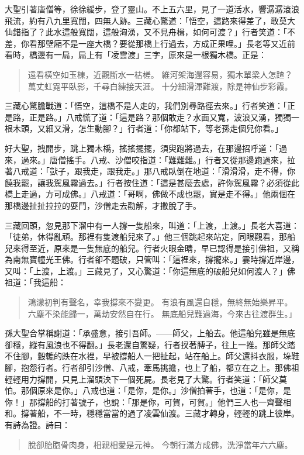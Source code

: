 大聖引著唐僧等，徐徐緩步，登了靈山。不上五六里，見了一道活水，響潺潺滾浪飛流，約有八九里寬闊，四無人跡。三藏心驚道：「悟空，這路來得差了，敢莫大仙錯指了？此水這般寬闊，這般洶湧，又不見舟楫，如何可渡？」行者笑道：「不差，你看那壁廂不是一座大橋？要從那橋上行過去，方成正果哩。」長老等又近前看時，橋邊有一扁，扁上有「凌雲渡」三字，原來是一根獨木橋。正是：
\begin{quote}
遠看橫空如玉棟，近觀斷水一枯槎。
維河架海還容易，獨木單梁人怎蹅？
萬丈虹霓平臥影，千尋白練接天涯。
十分細滑渾難渡，除是神仙步彩霞。
\end{quote}

三藏心驚膽戰道：「悟空，這橋不是人走的，我們別尋路徑去來。」行者笑道：「正是路，正是路。」八戒慌了道：「這是路？那個敢走？水面又寬，波浪又湧，獨獨一根木頭，又細又滑，怎生動腳？」行者道：「你都站下，等老孫走個兒你看。」

好大聖，拽開步，跳上獨木橋，搖搖擺擺，須臾跑將過去，在那邊招呼道：「過來，過來。」唐僧搖手。八戒、沙僧咬指道：「難難難。」行者又從那邊跑過來，拉著八戒道：「獃子，跟我走，跟我走。」那八戒臥倒在地道：「滑滑滑，走不得，你饒我罷，讓我駕風霧過去。」行者按住道：「這是甚麼去處，許你駕風霧？必須從此橋上走過，方可成佛。」八戒道：「哥啊，佛做不成也罷，實是走不得。」他兩個在那橋邊扯扯拉拉的耍鬥，沙僧走去勸解，才撒脫了手。

三藏回頭，忽見那下溜中有一人撐一隻船來，叫道：「上渡，上渡。」長老大喜道：「徒弟，休得亂頑。那裡有隻渡船兒來了。」他三個跳起來站定，同眼觀看，那船兒來得至近，原來是一隻無底的船兒。行者火眼金睛，早已認得是接引佛祖，又稱為南無寶幢光王佛。行者卻不題破，只管叫：「這裡來，撐攏來。」霎時撐近岸邊，又叫：「上渡，上渡。」三藏見了，又心驚道：「你這無底的破船兒如何渡人？」佛祖道：「我這船：
\begin{quote}
鴻濛初判有聲名，幸我撐來不變更。
有浪有風還自穩，無終無始樂昇平。
六塵不染能歸一，萬劫安然自在行。
無底船兒難過海，今來古往渡群生。」
\end{quote}

孫大聖合掌稱謝道：「承盛意，接引吾師。——師父，上船去。他這船兒雖是無底卻穩，縱有風浪也不得翻。」長老還自驚疑，行者扠著膊子，往上一推。那師父踏不住腳，轂轆的跌在水裡，早被撐船人一把扯起，站在船上。師父還抖衣服，垛鞋腳，抱怨行者。行者卻引沙僧、八戒，牽馬挑擔，也上了船，都立在之上。那佛祖輕輕用力撐開，只見上溜頭泱下一個死屍。長老見了大驚。行者笑道：「師父莫怕。那個原來是你。」八戒也道：「是你，是你。」沙僧拍著手，也道：「是你，是你！」那撐船的打著號子，也說：「那是你，可賀，可賀。」他們三人也一齊聲相和。撐著船，不一時，穩穩當當的過了凌雲仙渡。三藏才轉身，輕輕的跳上彼岸。有詩為證。詩曰：
\begin{quote}
脫卻胎胞骨肉身，相親相愛是元神。
今朝行滿方成佛，洗淨當年六六塵。
\end{quote}

